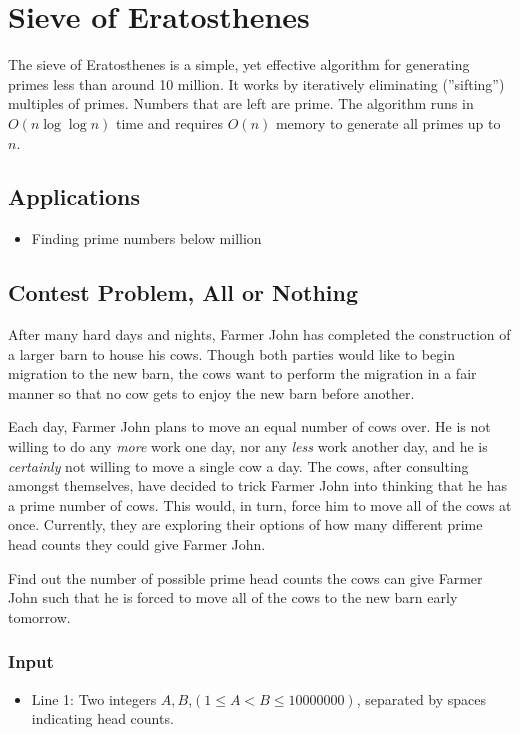 \section{Sieve of Eratosthenes}
The sieve of Eratosthenes is a simple, yet effective algorithm for generating primes less than around 10 million.
It works by iteratively eliminating (''sifting'') multiples of primes.
Numbers that are left are prime.
The algorithm runs in $O(n\log\log n)$ time and requires $O(n)$ memory to generate all primes up to $n$.

\subsection{Applications}
\begin{itemize}
	\item	Finding prime numbers below  million
\end{itemize}

\subsection{Contest Problem, All or Nothing}
After many hard days and nights, Farmer John has completed the construction of a larger barn to house his cows.
Though both parties would like to begin migration to the new barn, the cows want to perform the migration in a fair manner so that no cow gets to enjoy the new barn before another.

Each day, Farmer John plans to move an equal number of cows over.
He is not willing to do any \textit{more} work one day, nor any \textit{less} work another day, and he is \textit{certainly} not willing to move a single cow a day.
The cows, after consulting amongst themselves, have decided to trick Farmer John into thinking that he has a prime number of cows.
This would, in turn, force him to move all of the cows at once.
Currently, they are exploring their options of how many different prime head counts they could give Farmer John.

Find out the number of possible prime head counts the cows can give Farmer John such that he is forced to move all of the cows to the new barn early tomorrow.

\subsubsection{Input}
\begin{itemize}
	\item Line 1: Two integers $A,B$,$(1 \leq A < B \leq 10000000)$, separated by spaces indicating head counts.
\end{itemize}

